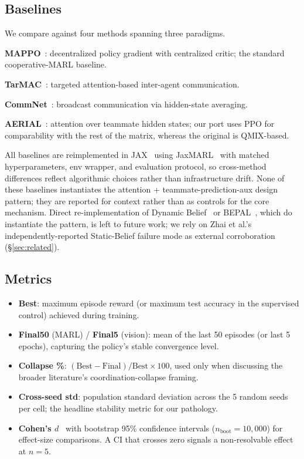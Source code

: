 \documentclass{article}
\theoremstyle{plain}
\theoremstyle{definition}
\theoremstyle{remark}
\begin{document}
\subsection{Baselines}
\label{app:baselines_full}

We compare against four methods spanning three paradigms.

\textbf{MAPPO}~\cite{yu2022surprising}: decentralized policy
gradient with centralized critic; the standard cooperative-MARL
baseline.

\textbf{TarMAC}~\cite{das2019tarmac}: targeted attention-based
inter-agent communication.

\textbf{CommNet}~\cite{sukhbaatar2016commnet}: broadcast
communication via hidden-state averaging.

\textbf{AERIAL}~\cite{phan2023attention}: attention over teammate
hidden states; our port uses PPO for comparability with the rest of
the matrix, whereas the original is QMIX-based.

All baselines are reimplemented in JAX~\cite{bradbury2018jax} using
JaxMARL~\cite{rutherford2024jaxmarl} with matched hyperparameters,
env wrapper, and evaluation protocol, so cross-method differences
reflect algorithmic choices rather than infrastructure drift. None
of these baselines instantiates the attention + teammate-prediction-aux
design pattern; they are reported for context rather than as
controls for the core mechanism. Direct re-implementation of Dynamic
Belief~\cite{zhai2023dynamic} or BEPAL~\cite{huang2025bepal}, which
do instantiate the pattern, is left to future work; we rely on
Zhai et al.'s independently-reported Static-Belief failure mode as
external corroboration (\S\ref{sec:related}).

\subsection{Metrics}
\label{app:metrics_full}

\begin{itemize}
    \item \textbf{Best}: maximum episode reward (or maximum test
    accuracy in the supervised control) achieved during training.
    \item \textbf{Final50} (MARL) / \textbf{Final5} (vision): mean
    of the last 50 episodes (or last 5 epochs), capturing the
    policy's stable convergence level.
    \item \textbf{Collapse \%}:
    $({\mathrm{Best} - \mathrm{Final}}) / {\mathrm{Best}} \times 100$,
    used only when discussing the broader literature's
    coordination-collapse framing.
    \item \textbf{Cross-seed std}: population standard deviation
    across the 5 random seeds per cell; the headline stability
    metric for our pathology.
    \item \textbf{Cohen's $d$}~\cite{cohen1988statistical} with
    bootstrap 95\% confidence intervals ($n_{\mathrm{boot}} =
    10{,}000$) for effect-size comparisons. A CI that crosses zero
    signals a non-resolvable effect at $n=5$.
\end{itemize}
\end{document}
